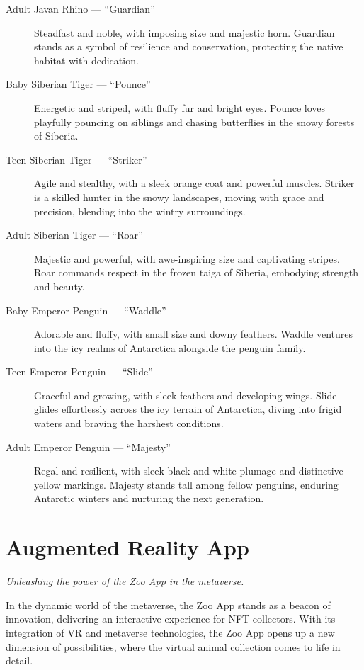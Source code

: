 \begin{description}
  \item[Adult Javan Rhino --- ``Guardian''] Steadfast and noble, with imposing size and majestic horn. Guardian stands as a symbol of resilience and conservation, protecting the native habitat with dedication.

  \item[Baby Siberian Tiger --- ``Pounce''] Energetic and striped, with fluffy fur and bright eyes. Pounce loves playfully pouncing on siblings and chasing butterflies in the snowy forests of Siberia.

  \item[Teen Siberian Tiger --- ``Striker''] Agile and stealthy, with a sleek orange coat and powerful muscles. Striker is a skilled hunter in the snowy landscapes, moving with grace and precision, blending into the wintry surroundings.

  \item[Adult Siberian Tiger --- ``Roar''] Majestic and powerful, with awe-inspiring size and captivating stripes. Roar commands respect in the frozen taiga of Siberia, embodying strength and beauty.

  \item[Baby Emperor Penguin --- ``Waddle''] Adorable and fluffy, with small size and downy feathers. Waddle ventures into the icy realms of Antarctica alongside the penguin family.

  \item[Teen Emperor Penguin --- ``Slide''] Graceful and growing, with sleek feathers and developing wings. Slide glides effortlessly across the icy terrain of Antarctica, diving into frigid waters and braving the harshest conditions.

  \item[Adult Emperor Penguin --- ``Majesty''] Regal and resilient, with sleek black-and-white plumage and distinctive yellow markings. Majesty stands tall among fellow penguins, enduring Antarctic winters and nurturing the next generation.
\end{description}

\section{Augmented Reality App}
\label{sec:ar-app}

\textit{Unleashing the power of the Zoo App in the metaverse.}

In the dynamic world of the metaverse, the Zoo App stands as a beacon of innovation, delivering an interactive experience for NFT collectors. With its integration of VR and metaverse technologies, the Zoo App opens up a new dimension of possibilities, where the virtual animal collection comes to life in detail.

